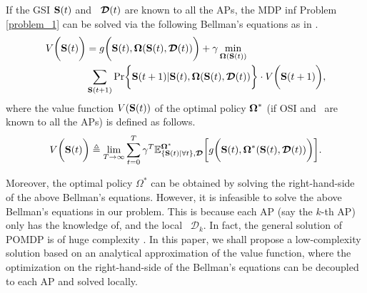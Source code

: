 If the GSI $\mathbf{S}(t)$ and \brlatency~$\boldsymbol{\mathcal{D}}(t)$ are known to all the APs, the MDP inf Problem \ref{problem_1} can be solved via the following Bellman's equations as in \cite{sutton1998}.
\begin{align}
    V\Paren{\Stat(t)} &=g\Paren{\Stat(t), \Policy(\Stat(t), \Delay(t))}
        + \gamma \min_{\Policy(\Stat(t))}
        \nonumber\\
        &\sum_{\Stat(t+1)} \Pr\Brace{ \Stat(t+1)|\Stat(t), \Policy(\Stat(t), \Delay(t)) } \cdot V\Paren{\Stat(t+1)},
    \label{eqn:sp_0}
\end{align}
where the value function $V(\mathbf{S}(t))$ of the optimal policy $\boldsymbol{\Omega}^{*}$ (if OSI and \brlatency~are known to all the APs) is defined as follows.
\begin{align}
    V\bigg(\mathbf{S}(t)\bigg) \triangleq \lim_{T\to\infty} \sum_{t=0}^{T} \gamma^{T}
    \mathbb{E}^{\boldsymbol{\Omega}^*}_{\{\mathbf{S}(t)|\forall t\}, \boldsymbol{\mathcal{D}}} \bigg[
        g\bigg( \mathbf{S}(t), \boldsymbol{\Omega}^{*}(\mathbf{S}(t), \boldsymbol{\mathcal{D}}(t)) \bigg)
    \bigg].
\end{align}

Moreover, the optimal policy $\Omega^{*}$ can be obtained by solving the right-hand-side of the above Bellman's equations.
However, it is infeasible to solve the above Bellman's equations in our problem.
This is because each AP (say the $k$-th AP) only has the knowledge of, and the local \brlatency~$\mathcal{D}_{k}$.
In fact, the general solution of POMDP is of huge complexity \cite{IJCAI03-NairR,IJCAI99-BoutilierC}.
In this paper, we shall propose a low-complexity solution based on an analytical approximation of the value function, where the optimization on the right-hand-side of the Bellman's equations can be decoupled to each AP and solved locally.
